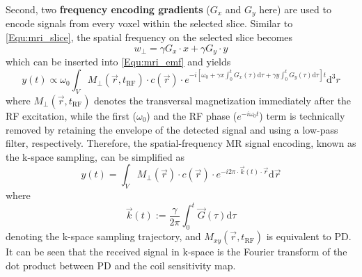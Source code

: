 Second, two \textbf{frequency encoding gradients} ($G_x$ and $G_y$ here) are used to encode signals from every voxel within the selected slice. Similar to \cref{Equ:mri_slice}, the spatial frequency on the selected slice becomes
\begin{equation} \label{Equ:mri_freq}
  w_{\perp} = \gamma G_x \cdot x + \gamma G_y \cdot y
\end{equation}
which can be inserted into \cref{Equ:mri_emf} and yields
\begin{equation} \label{Equ:emf_grad}
  y(t) \propto \omega_0 \int_{V} M_{\perp} (\vec{r},t_{\text{RF}}) \cdot c(\vec{r}) \cdot e^{- i [\omega_0 + \gamma x \int_{0}^{t} G_x(\tau) \text{d}\tau + \gamma y \int_{0}^{t} G_y(\tau) \text{d}\tau] t } \text{d}^{3} r
\end{equation}
where $M_{\perp}(\vec{r}, t_{\text{RF}})$ denotes the transversal magnetization immediately after the RF excitation, while the first ($\omega_0$) and the RF phase ($e^{-i \omega_0 t}$) term is technically removed by retaining the envelope of the detected signal and using a low-pass filter, respectively. Therefore, the spatial-frequency MR signal encoding, known as the k-space sampling, can be simplified as
\begin{equation} \label{Equ:mri_signal}
  y(t) = \int_{V} M_{\perp}(\vec{r}) \cdot c(\vec{r}) \cdot e^{-i 2\pi \cdot \vec{k} (t) \cdot \vec{r}} \text{d} \vec{r}
\end{equation}
where 
\begin{equation} \label{Equ:mri_ktrj}
  \vec{k} (t) := \frac{\gamma}{2\pi} \int_{0}^{t} \vec{G} (\tau) \text{d} \tau
\end{equation}
denoting the k-space sampling trajectory, and $M_{xy}(\vec{r}, t_{\text{RF}})$ is equivalent to \acs{PD}. It can be seen that the received signal in k-space is the Fourier transform of the dot product between PD and the coil sensitivity map.



